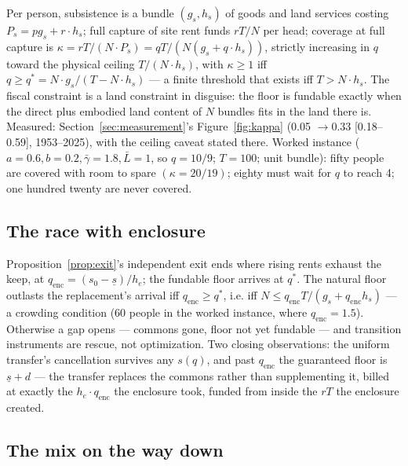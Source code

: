\documentclass[12pt]{article}
\theoremstyle{plain}
\begin{document}
Per person, subsistence is a bundle $(g_s, h_s)$ of goods and land services costing $P_s = p g_s + r\cdot h_s$; full capture of site rent funds $rT/N$ per head; coverage at full capture is $\kappa = rT/(N\cdot P_s) = qT/(N(g_s + q\cdot h_s))$, strictly increasing in $q$ toward the physical ceiling $T/(N\cdot h_s)$, with $\kappa \ge 1$ iff $q \ge q^* = N\cdot g_s/(T - N\cdot h_s)$ --- a finite threshold that exists iff $T > N\cdot h_s$. The fiscal constraint is a land constraint in disguise: the floor is fundable exactly when the direct plus embodied land content of $N$ bundles fits in the land there is. Measured: Section~\ref{sec:measurement}'s Figure~\ref{fig:kappa} (0.05 $\to 0.33$ [0.18--0.59], 1953--2025), with the ceiling caveat stated there. Worked instance ($a = 0.6, b = 0.2, \bar{\gamma} = 1.8, \bar{L} = 1$, so $q = 10/9$; $T = 100$; unit bundle): fifty people are covered with room to spare $(\kappa = 20/19)$; eighty must wait for $q$ to reach 4; one hundred twenty are never covered.

\subsection{The race with enclosure}\label{app:race}

Proposition~\ref{prop:exit}'s independent exit ends where rising rents exhaust the keep, at $q_{\mathrm{enc}} = (s_0-\underline{s})/h_e$; the fundable floor arrives at $q^*$. The natural floor outlasts the replacement's arrival iff $q_{\mathrm{enc}} \ge q^*$, i.e. iff $N \le q_{\mathrm{enc}}T/(g_s + q_{\mathrm{enc}}h_s)$ --- a crowding condition (60 people in the worked instance, where $q_{\mathrm{enc}} = 1.5$). Otherwise a gap opens --- commons gone, floor not yet fundable --- and transition instruments are rescue, not optimization. Two closing observations: the uniform transfer's cancellation survives any $s(q)$, and past $q_{\mathrm{enc}}$ the guaranteed floor is $\underline{s} + d$ --- the transfer replaces the commons rather than supplementing it, billed at exactly the $h_e\cdot q_{\mathrm{enc}}$ the enclosure took, funded from inside the $rT$ the enclosure created.

\subsection{The mix on the way down}\label{app:mix}
\end{document}
